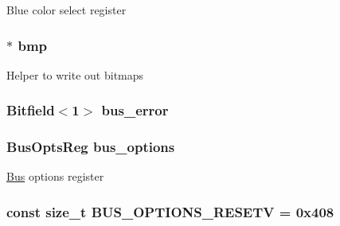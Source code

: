 Blue color select register \hypertarget{classHDLcd_ada429bf89af3356a338f9532d68623cc}{
\subsubsection[{bmp}]{$\ast$ {\bf bmp}}}
\label{classHDLcd_ada429bf89af3356a338f9532d68623cc}
Helper to write out bitmaps \hypertarget{classHDLcd_a74212c0c2707c7e25bad89d6ac3004c9}{
\subsubsection[{burst\_\-len}]{}}
\label{classHDLcd_a74212c0c2707c7e25bad89d6ac3004c9}
\hypertarget{classHDLcd_ad92f2664318eb7510c5ef4ed537fff93}{
\subsubsection[{bus\_\-error}]{\setlength{\rightskip}{0pt plus 5cm}Bitfield$<$1$>$ {\bf bus\_\-error}}}
\label{classHDLcd_ad92f2664318eb7510c5ef4ed537fff93}
\hypertarget{classHDLcd_afdc67b9cdc0c178e0855cbe989449577}{
\subsubsection[{bus\_\-options}]{\setlength{\rightskip}{0pt plus 5cm}BusOptsReg {\bf bus\_\-options}}}
\label{classHDLcd_afdc67b9cdc0c178e0855cbe989449577}
\hyperlink{namespaceBus}{Bus} options register \hypertarget{classHDLcd_aaf19ce46531fc85edba07a0a76b30a5f}{
\subsubsection[{BUS\_\-OPTIONS\_\-RESETV}]{\setlength{\rightskip}{0pt plus 5cm}const size\_\-t {\bf BUS\_\-OPTIONS\_\-RESETV} = 0x408}}
